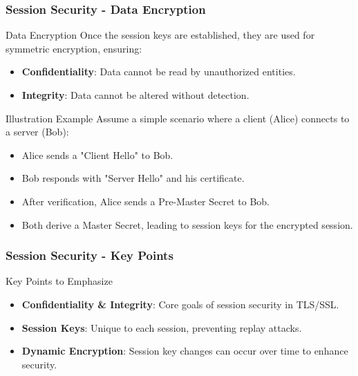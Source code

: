 \documentclass{beamer}
\begin{document}
\begin{frame}[fragile]
    \frametitle{Session Security - Data Encryption}
    \begin{block}{Data Encryption}
        Once the session keys are established, they are used for symmetric encryption, ensuring:
    \end{block}
    \begin{itemize}
        \item \textbf{Confidentiality}: Data cannot be read by unauthorized entities.
        \item \textbf{Integrity}: Data cannot be altered without detection.
    \end{itemize}
    \begin{exampleblock}{Illustration Example}
        Assume a simple scenario where a client (Alice) connects to a server (Bob):
        \begin{itemize}
            \item Alice sends a "Client Hello" to Bob.
            \item Bob responds with "Server Hello" and his certificate.
            \item After verification, Alice sends a Pre-Master Secret to Bob.
            \item Both derive a Master Secret, leading to session keys for the encrypted session.
        \end{itemize}
    \end{exampleblock}
\end{frame}

\begin{frame}[fragile]
    \frametitle{Session Security - Key Points}
    \begin{block}{Key Points to Emphasize}
        \begin{itemize}
            \item \textbf{Confidentiality \& Integrity}: Core goals of session security in TLS/SSL.
            \item \textbf{Session Keys}: Unique to each session, preventing replay attacks.
            \item \textbf{Dynamic Encryption}: Session key changes can occur over time to enhance security.
        \end{itemize}
    \end{block}
\end{frame}
\end{document}
